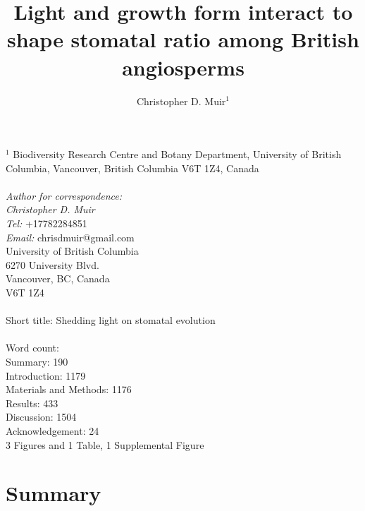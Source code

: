 \documentclass[12pt, oneside]{article}
\newcommand{\stretchy}{1.5}
\begin{document}


\title{Light and growth form interact to shape stomatal ratio among British angiosperms}
\author{Christopher D. Muir$^1$}
\date{} %

\maketitle

$^1$ Biodiversity Research Centre and Botany Department, University of British Columbia, Vancouver, British Columbia V6T 1Z4, Canada \\
\\
\textit{Author for correspondence:} \\
\textit{Christopher D. Muir} \\
\textit{Tel:} +17782284851 \\
\textit{Email:} chrisdmuir@gmail.com \\
University of British Columbia \\
6270 University Blvd. \\
Vancouver, BC, Canada \\
V6T 1Z4 \\
\\
Short title: Shedding light on stomatal evolution\\
\\
Word count: \\
Summary: 190\\
Introduction: 1179\\
Materials and Methods: 1176\\
Results: 433\\
Discussion: 1504\\
Acknowledgement: 24\\
3 Figures and 1 Table, 1 Supplemental Figure


\linenumbers
\setstretch{\stretchy}

\section*{Summary}
\end{document}
